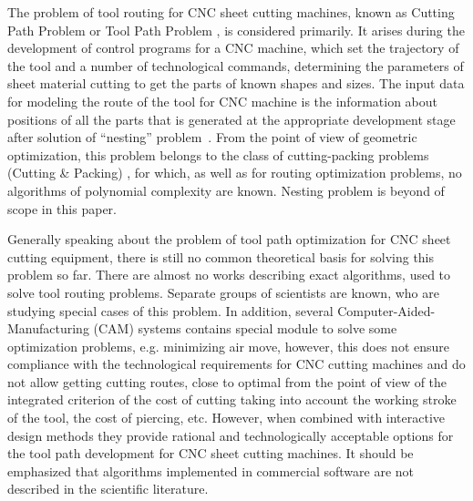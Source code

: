 \documentclass[numbers,sort&compress]{IntechOpen-Book}%
\begin{document}
The problem of tool routing for CNC sheet cutting machines,
known as Cutting Path Problem or Tool Path Problem \cite{bibx:100},
is considered primarily.
It arises during the development of control programs for a CNC machine,
which set the trajectory of the tool and a number of technological commands,
determining the parameters of sheet material cutting to get
the parts of known shapes and sizes.
The input data for modeling the route of the tool for CNC machine
is the information about positions of all the parts
that is generated at the appropriate development stage
after solution of ``nesting'' problem~\cite{bibx:101, bibx:102, bibx:303}.
From the point of view of geometric optimization,
this problem belongs to the class of cutting-packing problems
(Cutting \& Packing) \cite{bibx:103},
for which, as well as for routing optimization problems,
no algorithms of polynomial complexity are known.
Nesting problem is beyond of scope in this paper.

Generally speaking about the problem of tool path optimization
for CNC sheet cutting  equipment,
there is still no common theoretical basis for solving this problem
so far.
There are almost no works describing exact algorithms,
used to solve tool routing problems.
Separate groups of scientists are known,
who are studying special cases of this problem.
In addition,
several Computer-Aided-Manufacturing (CAM) systems
contains special module to solve some optimization problems,
e.g. minimizing air move,
however, this does not ensure compliance
with the technological requirements for CNC cutting machines
and do not allow getting cutting routes,
close to optimal from the point of view of the integrated criterion of the cost of cutting
taking into account the working stroke of the tool,
the cost of piercing, etc.
However, when combined with interactive design methods
they provide rational and technologically acceptable options
for the tool path development for CNC sheet cutting machines.
It should be emphasized that algorithms implemented in commercial software
are not described in the scientific literature.
\end{document}
